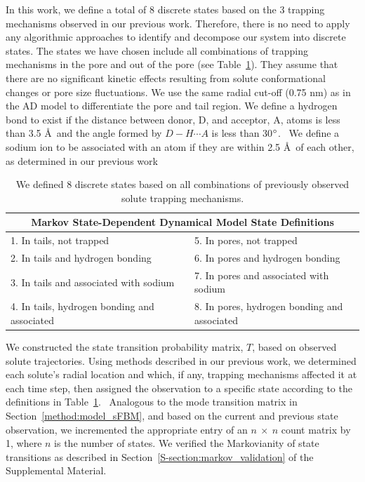 \documentclass[aps,pre,preprint,groupedaddress,longbibliography]{revtex4-2}
\begin{document}
  In this work, we define a total of 8 discrete states based on the 3 trapping
  mechanisms observed in our previous work. Therefore, there is no need to 
  apply any algorithmic approaches to identify and decompose our system into 
  discrete states. The states we have chosen include all combinations of trapping
  mechanisms in the pore and out of the pore (see Table~\ref{table:states}). They
  assume that there are no significant kinetic effects resulting from solute 
  conformational changes or pore size fluctuations. We use the same radial cut-off
  (0.75 nm) as in the AD model to differentiate the pore and tail region.  We define 
  a hydrogen bond to exist if the distance between donor, D, and acceptor, A, 
  atoms is less than 3.5 \AA~and the angle formed by $D-H \cdots A$ is less than
  30$\degree$.~\cite{luzar_effect_1996} We define a sodium ion to be associated 
  with an atom if they are within 2.5 \AA~of each other, as determined in our 
  previous work~\cite{coscia_chemically_2019}
  
  \begin{table}[!htb]
	  \centering
	  \begin{tabular}{ll}
            \hline
            \hline
	  \multicolumn{2}{c}{Markov State-Dependent Dynamical Model State Definitions} \\
	  \hline
	  1. In tails, not trapped                      & 5. In pores, not trapped                     \\
	  2. In tails and hydrogen bonding              & 6. In pores and hydrogen bonding             \\
	  3. In tails and associated with sodium        & 7. In pores and associated with sodium       \\
	  4. In tails, hydrogen bonding and associated  ~~~~& 8. In pores, hydrogen bonding and associated \\
	  \hline
          \hline
	  \end{tabular}
	  \caption{We defined 8 discrete states based on all combinations of previously observed solute
	  trapping mechanisms.}\label{table:states}  
  \end{table}
  
  We constructed the state transition probability matrix, $T$, based on observed 
  solute trajectories. Using methods described in our previous work, we determined 
  each solute's radial location and which, if any, trapping mechanisms affected 
  it at each time step, then assigned the observation to a specific state according
  to the definitions in Table~\ref{table:states}.~\cite{coscia_chemically_2019}
  Analogous to the mode transition matrix in Section~\ref{method:model_sFBM}, and 
  based on the current and previous state observation, we incremented the appropriate
  entry of an $n~\times~n$ count matrix by 1, where $n$ is the number of states. We
  verified the Markovianity of state transitions as described in 
  Section~\ref{S-section:markov_validation} of the Supplemental Material.
  
\end{document}

